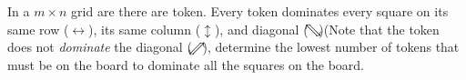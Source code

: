 In a $m\times{n}$ grid are there are token. Every  token dominates  every square on its same row ($\leftrightarrow$), its same column ($\updownarrow$), and diagonal ($\searrow\hspace{-4.45mm}\nwarrow$)(Note that the token does not \emph{dominate} the diagonal ($\nearrow\hspace{-4.45mm}\swarrow$), determine the lowest number of tokens that must be on the board to dominate  all the squares on the board.